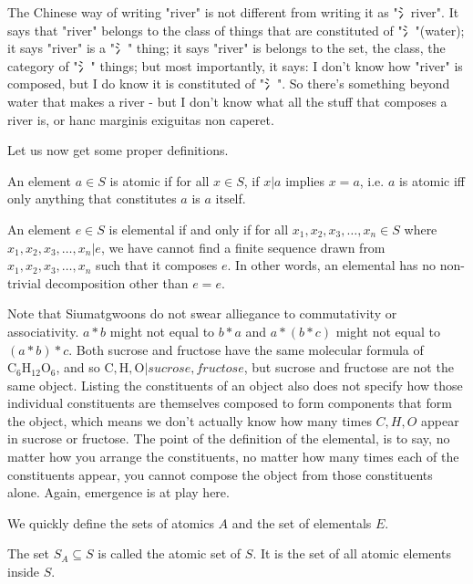 The Chinese way of writing "river" is not different from writing it as "氵river". It says that "river" belongs to the class of things that are constituted of "氵"(water); it says "river" is a "氵" thing; it says "river" is belongs to the set, the class, the category of "氵" things; but most importantly, it says: I don't know how "river" is composed, but I do know it is constituted of "氵". So there's something beyond water that makes a river - but I don't know what all the stuff that composes a river is, or hanc marginis exiguitas non caperet.

Let us now get some proper definitions.


\begin{definition}[Atomics]\label{def:atomics}
    An element $a \in S$ is atomic if for all $x\in S$, if $x|a$ implies $x=a$, i.e. $a$ is atomic iff only anything that constitutes $a$ is $a$ itself.
\end{definition}

\begin{definition}[Elementals]\label{def:elementals}
    An element $e \in S$ is elemental if and only if for all $x_1, x_2, x_3, \ldots, x_n \in S$ where $x_1, x_2, x_3, \ldots, x_n | e$, we have cannot find a finite sequence drawn from $x_1, x_2, x_3,\ldots, x_n $ such that it composes $e$. In other words, an elemental has no non-trivial decomposition other than $e = e$. 
\end{definition}


Note that Siumatgwoons do not swear alliegance to commutativity or associativity. $a*b$ might not equal to $b*a$ and $a*(b*c)$ might not equal to $(a*b)*c$. Both sucrose and fructose have the same molecular formula of $\text{C}_6\text{H}_{12}\text{O}_6$, and so $\text{C}, \text{H}, \text{O} | sucrose, fructose$, but sucrose and fructose are not the same object. Listing the constituents of an object also does not specify how those individual constituents are themselves composed to form components that form the object, which means we don't actually know how many times $C, H, O$ appear in sucrose or fructose. The point of the definition of the elemental, is to say, no matter how you arrange the constituents, no matter how many times each of the constituents appear, you cannot compose the object from those constituents alone. Again, emergence is at play here.



We quickly define the sets of atomics $A$ and the set of elementals $E$.

\begin{definition}\label{def:atomic-set}
    The set $S_A \subseteq S$ is called the atomic set of $S$. It is the set of all atomic elements inside $S$.
\end{definition}

